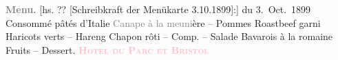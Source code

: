            \pstart
           \centering{}\textcolor{gray}{\textbf{Menu.}}{ }{[}hs. ?? [Schreibkraft der Menükarte 3.10.1899]:{]} du 3. Oct. 1899\pend
           \pstart
           \noindent{}\centering{}Consommé pâtés d’Italie\pend
           \pstart
           \noindent{}\centering{}\textcolor{gray}{Canape à la meuni}ère – Pommes\pend
           \pstart
           \noindent{}\centering{}Roastbeef garni\pend
           \pstart
           \noindent{}\centering{}Haricots verts – Hareng\pend
           \pstart
           \noindent{}\centering{}Chapon rôti – Comp. – Salade\pend
           \pstart
           \noindent{}\centering{}Bavarois à la romaine\pend
           \pstart
           \noindent{}\centering{}Fruits – Dessert.\pend
           \pstart
           \noindent{}\textcolor{gray}{\textbf{\textsc{\textcolor{pink}{Hotel du Parc et Bristol}{}}}}\pend
           \endnumbering{}  
      